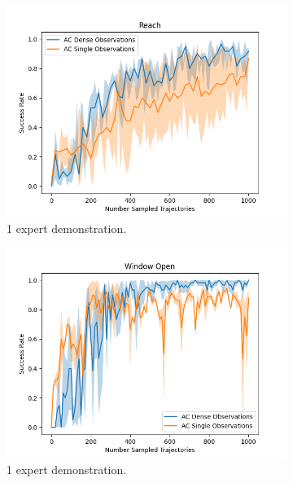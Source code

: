 \begin{figure}[htbp]
  \centering
  \begin{subfigure}[t]{0.32\textwidth}
    \includegraphics[width=\textwidth]{images/dense_vs_sparse_1/Reach.png}
    \caption{1 expert demonstration.}
  \end{subfigure}
  \medskip
  \begin{subfigure}[t]{0.32\textwidth}
    \includegraphics[width=\textwidth]{images/dense_vs_sparse_1/Window Open.png}
    \caption{1 expert demonstration.}
  \end{subfigure}
  \hfill
  \begin{subfigure}[t]{0.32\textwidth}

\end{subfigure}
\end{figure}
